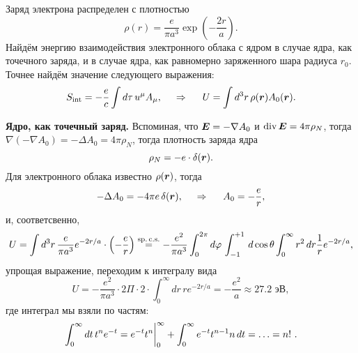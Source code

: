 
Заряд электрона распределен с плотностью
\begin{equation*}
    \rho(r) = \frac{e}{\pi a^3} \exp\left(-\frac{2r}{a}\right).
\end{equation*}
Найдём энергию взаимодействия электронного облака с ядром в случае ядра, как точечного заряда, и в случае ядра, как равномерно заряженного шара  радиуса $r_0$. Точнее найдём значение следующего выражения:
\begin{equation*}
    {S}_{\textnormal{int}} = - \frac{e}{c} \int d \tau\, u^\mu A_\mu,
    \hspace{0.5cm} \Rightarrow \hspace{0.5cm}
    U = \int d^3 r\, \rho(\mbox{\boldmath $r$}) A_0 (\mbox{\boldmath $r$}).
\end{equation*}


\textbf{Ядро, как точечный заряд.} Вспоминая, что $\mbox{\boldmath $E$} = - \nabla A_0$ и $\mathop{\mathrm{div}}\nolimits \mbox{\boldmath $E$} = 4 \pi \rho_N$, тогда $\nabla(-\nabla A_0) = - \Delta A_0 = 4 \pi \rho_N$, тогда плотность заряда ядра
\begin{equation*}
    \rho_N = -e \cdot \delta(\mbox{\boldmath $r$}).
\end{equation*}
Для электронного облака известно $\rho(\mbox{\boldmath $r$})$, тогда
\begin{equation*}
    - \Delta A_0 = - 4 \pi e \, \delta(\mbox{\boldmath $r$}),
    \hspace{0.5cm} \Rightarrow \hspace{0.5cm}
    A_0 = - \frac{e}{r}, 
\end{equation*}
и, соответсвенно,
\begin{equation*}
    U = \int d^3 r\, 
    \frac{e}{\pi a^3} e^{-2r/a} \cdot \left(-\frac{e}{r}\right) \overset{\mathrm{sp.\, c.s.}}{=}
    - \frac{e^2}{\pi a^3} \int_{0}^{2\pi} d \varphi\, \int_{-1}^{+1} \, d \cos \theta \int_{0}^{\infty} r^2 \, d r \frac{1}{r} e^{-2r/a},
\end{equation*}
упрощая выражение, переходим к интегралу вида
\begin{equation*}
    U = - \frac{e^2}{\pi a^3} \cdot 2 \Pi \cdot 2  \cdot \int_{0}^{\infty}dr\, r e^{-2r/a}
    = - \frac{e^2}{a} \approx 27.2 \text{\ эВ}
    ,
\end{equation*}
где интеграл мы взяли по частям:
\begin{equation*}
    \int_{0}^{\infty} dt\, t^n e^{-t} = e^{-t} t^n \bigg|_{0}^{\infty} + \int_{0}^{\infty} e^{-t} t^{n-1} n \, d t = \ldots = n!\ .
\end{equation*}

